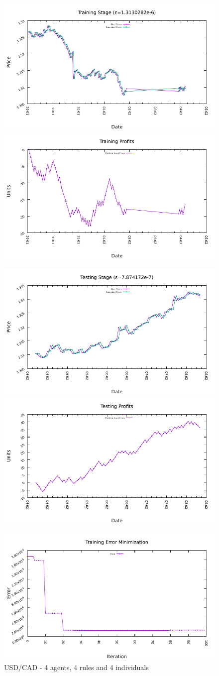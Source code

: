 \begin{figure}[htp]
  \centering

  \includegraphics[width=.45\textwidth]{img/plots/usd_cad_h1-4agents-4rules-4ind-100gen_training_fit.pdf}\quad
  \includegraphics[width=.45\textwidth]{img/plots/usd_cad_h1-4agents-4rules-4ind-100gen_training_profits.pdf}

  \medskip

  \includegraphics[width=.45\textwidth]{img/plots/usd_cad_h1-4agents-4rules-4ind-100gen_testing_fit.pdf}\quad
  \includegraphics[width=.45\textwidth]{img/plots/usd_cad_h1-4agents-4rules-4ind-100gen_testing_profits.pdf}

  \medskip

  \includegraphics[width=.45\textwidth]{img/plots/usd_cad_h1-4agents-4rules-4ind-100gen_error_minimization.pdf}

  \caption{USD/CAD - 4 agents, 4 rules and 4 individuals}
  \label{figure:usd-cad-4agents-4rules-4individuals}
\end{figure}

